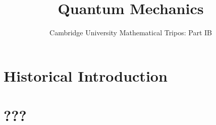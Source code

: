 \documentclass{article}
\title{Quantum Mechanics}
\author{Cambridge University Mathematical Tripos: Part IB}
\begin{document}
\maketitle

\tableofcontentsnewpage{}

\section{Historical Introduction}

\section{???}

\end{document}
